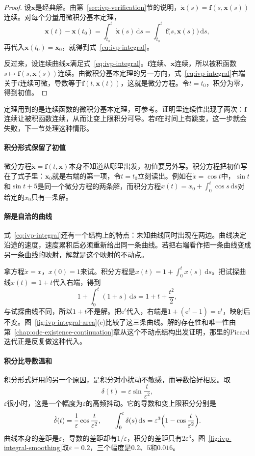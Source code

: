 \begin{proof}
 设$\bm{x}$是经典解。由第~\ref{sec:ivp-verification}节的说明，$\dot{\bm{x}}(s)=\bm{f}(s,\bm{x}(s))$连续。对每个分量用微积分基本定理，
 \[
 \bm{x}(t)-\bm{x}(t_0)=\int_{t_0}^{t}\dot{\bm{x}}(s)\,\mathrm{d}s
 =\int_{t_0}^{t}\bm{f}\bigl(s,\bm{x}(s)\bigr)\,\mathrm{d}s,
 \]
 再代入$\bm{x}(t_0)=\bm{x}_0$，就得到式~\eqref{eq:ivp-integral}。

 反过来，设连续曲线$\bm{x}$满足式~\eqref{eq:ivp-integral}。$\bm{f}$连续、$\bm{x}$连续，所以被积函数$s\mapsto\bm{f}(s,\bm{x}(s))$连续。由微积分基本定理的另一方向，式~\eqref{eq:ivp-integral}右端关于$t$连续可微，导数等于$\bm{f}(t,\bm{x}(t))$，这就是微分方程。令$t=t_0$，积分为零，得到初值。
\end{proof}

定理用到的是连续函数的微积分基本定理，可参考。证明里连续性出现了两次：$\bm{f}$连续让被积函数连续，从而让变上限积分可导。若$\bm{f}$在时间上有跳变，这一步就会失败，下一节处理这种情形。

\paragraph{积分形式保留了初值}
微分方程$\dot{\bm{x}}=\bm{f}(t,\bm{x})$本身不知道从哪里出发，初值要另外写。积分方程把初值写在了式子里：$\bm{x}_0$就是右端的第一项，令$t=t_0$立刻读出。例如在$\dot{x}=\cos t$中，$\sin t$和$\sin t+5$是同一个微分方程的两条解，而积分方程$x(t)=x_0+\int_0^t\cos s\,\mathrm{d}s$对给定的$x_0$只有一条解。

\paragraph{解是自洽的曲线}
式~\eqref{eq:ivp-integral}还有一个结构上的特点：未知曲线同时出现在两边。曲线决定沿途的速度，速度累积后必须重新给出同一条曲线。若把右端看作把一条曲线变成另一条曲线的映射，解就是这个映射的不动点。

拿方程$\dot{x}=x$，$x(0)=1$来试。积分方程是$x(t)=1+\int_0^t x(s)\,\mathrm{d}s$。把试探曲线$x(t)=1+t$代入右端，得到
\[
 1+\int_0^t(1+s)\,\mathrm{d}s=1+t+\frac{t^2}{2},
\]
与试探曲线不同，所以$1+t$不是解。把$\mathrm{e}^{t}$代入，右端是$1+(\mathrm{e}^{t}-1)=\mathrm{e}^{t}$，映射后不变。图~\ref{fig:ivp-integral-area}(c)比较了这三条曲线。解的存在性和唯一性由第~\ref{chap:ode-existence-continuation}章从这个不动点结构出发证明，那里的Picard迭代正是反复做这种代入。

\paragraph{积分比导数温和}
积分形式好用的另一个原因，是积分对小扰动不敏感，而导数恰好相反。取
\[
 \delta(t)=\varepsilon\sin\frac{t}{\varepsilon^2},
\]
$\varepsilon$很小时，这是一个幅度为$\varepsilon$的高频抖动。它的导数和变上限积分分别是
\[
 \dot{\delta}(t)=\frac{1}{\varepsilon}\cos\frac{t}{\varepsilon^2},\qquad
 \int_0^t\delta(s)\,\mathrm{d}s=\varepsilon^3\Bigl(1-\cos\frac{t}{\varepsilon^2}\Bigr).
\]
曲线本身的差距是$\varepsilon$，导数的差距却有$1/\varepsilon$，积分的差距只有$2\varepsilon^3$。图~\ref{fig:ivp-integral-smoothing}取$\varepsilon=0.2$，三个幅度是$0.2$、$5$和$0.016$。

